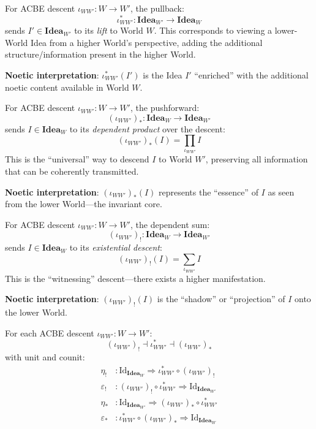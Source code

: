 \begin{definition}
\label{def:acbe-pullback}
For ACBE descent $\iota_{WW'} : W \to W'$, the pullback:
\[
  \iota_{WW'}^* : \mathbf{Idea}_{W'} \longrightarrow \mathbf{Idea}_W
\]
sends $I' \in \mathbf{Idea}_{W'}$ to its \emph{lift} to World $W$. This
corresponds to viewing a lower-World Idea from a higher World's perspective,
adding the additional structure/information present in the higher World.

\textbf{Noetic interpretation}: $\iota_{WW'}^*(I')$ is the Idea $I'$ ``enriched''
with the additional noetic content available in World $W$.
\end{definition}

\begin{definition}
\label{def:acbe-pushforward}
For ACBE descent $\iota_{WW'} : W \to W'$, the pushforward:
\[
  (\iota_{WW'})_* : \mathbf{Idea}_W \longrightarrow \mathbf{Idea}_{W'}
\]
sends $I \in \mathbf{Idea}_W$ to its \emph{dependent product} over the descent:
\[
  (\iota_{WW'})_*(I) = \prod_{\iota_{WW'}} I
\]
This is the ``universal'' way to descend $I$ to World $W'$, preserving all
information that can be coherently transmitted.

\textbf{Noetic interpretation}: $(\iota_{WW'})_*(I)$ represents the ``essence''
of $I$ as seen from the lower World---the invariant core.
\end{definition}

\begin{definition}
\label{def:acbe-dependent-sum}
For ACBE descent $\iota_{WW'} : W \to W'$, the dependent sum:
\[
  (\iota_{WW'})_! : \mathbf{Idea}_W \longrightarrow \mathbf{Idea}_{W'}
\]
sends $I \in \mathbf{Idea}_W$ to its \emph{existential descent}:
\[
  (\iota_{WW'})_!(I) = \sum_{\iota_{WW'}} I
\]
This is the ``witnessing'' descent---there exists a higher manifestation.

\textbf{Noetic interpretation}: $(\iota_{WW'})_!(I)$ is the ``shadow'' or
``projection'' of $I$ onto the lower World.
\end{definition}

\begin{theorem}
\label{thm:base-change-adjunctions}
For each ACBE descent $\iota_{WW'} : W \to W'$:
\[
  (\iota_{WW'})_! \dashv \iota_{WW'}^* \dashv (\iota_{WW'})_*
\]
with unit and counit:
\begin{align*}
  \eta_! &: \mathrm{Id}_{\mathbf{Idea}_W} \Rightarrow \iota_{WW'}^* \circ (\iota_{WW'})_! \\
  \varepsilon_! &: (\iota_{WW'})_! \circ \iota_{WW'}^* \Rightarrow \mathrm{Id}_{\mathbf{Idea}_{W'}} \\
  \eta_* &: \mathrm{Id}_{\mathbf{Idea}_{W'}} \Rightarrow (\iota_{WW'})_* \circ \iota_{WW'}^* \\
  \varepsilon_* &: \iota_{WW'}^* \circ (\iota_{WW'})_* \Rightarrow \mathrm{Id}_{\mathbf{Idea}_W}
\end{align*}
\end{theorem}


